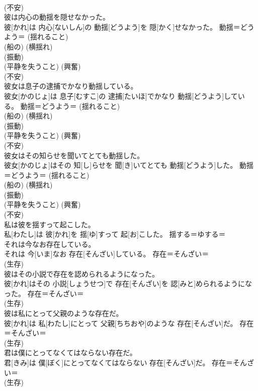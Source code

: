 \documentclass[8pt]{extreport}
\begin{document}
\begin{CJK}{UTF8}{min}
{\\	(不安) 
\\	彼は内心の動揺を隠せなかった。	
\\	彼[かれ]は 内心[ないしん]の 動揺[どうよう]を 隠[かく]せなかった。	動揺＝どうよう＝ (揺れること) 
\\	(船の) (横揺れ) 
\\	(振動) 
\\	(平静を失うこと) (興奮) 
\\	(不安) 
\\	彼女は息子の逮捕でかなり動揺している。	
\\	彼女[かのじょ]は 息子[むすこ]の 逮捕[たいほ]でかなり 動揺[どうよう]している。	動揺＝どうよう＝ (揺れること) 
\\	(船の) (横揺れ) 
\\	(振動) 
\\	(平静を失うこと) (興奮) 
\\	(不安) 
\\	彼女はその知らせを聞いてとても動揺した。	
\\	彼女[かのじょ]はその 知[し]らせを 聞[き]いてとても 動揺[どうよう]した。	動揺＝どうよう＝ (揺れること) 
\\	(船の) (横揺れ) 
\\	(振動) 
\\	(平静を失うこと) (興奮) 
\\	(不安) 
\\	私は彼を揺すって起こした。	
\\	私[わたし]は 彼[かれ]を 揺[ゆ]すって 起[お]こした。	揺する＝ゆする＝ 
\\	それは今なお存在している。	
\\	それは 今[いま]なお 存在[そんざい]している。	存在＝そんざい＝ 
\\	(生存) 
\\	彼はその小説で存在を認められるようになった。	
\\	彼[かれ]はその 小説[しょうせつ]で 存在[そんざい]を 認[みと]められるようになった。	存在＝そんざい＝ 
\\	(生存) 
\\	彼は私にとって父親のような存在だ。	
\\	彼[かれ]は 私[わたし]にとって 父親[ちちおや]のような 存在[そんざい]だ。	存在＝そんざい＝ 
\\	(生存) 
\\	君は僕にとってなくてはならない存在だ。	
\\	君[きみ]は 僕[ぼく]にとってなくてはならない 存在[そんざい]だ。	存在＝そんざい＝ 
\\	(生存) 
}
\end{CJK}
\end{document}
